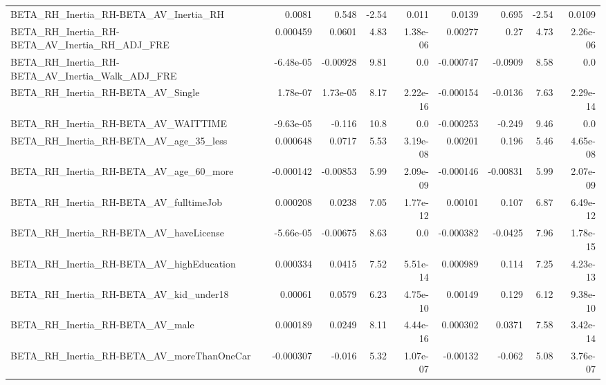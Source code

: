 \begin{tabular}{lrrrrrrrr}
BETA\_RH\_Inertia\_RH-BETA\_AV\_Inertia\_RH              &      0.0081 &        0.548 &    -2.54 &    0.011 &     0.0139 &       0.695 &        -2.54 &        0.0109 \\
BETA\_RH\_Inertia\_RH-BETA\_AV\_Inertia\_RH\_ADJ\_FRE      &    0.000459 &       0.0601 &     4.83 & 1.38e-06 &    0.00277 &        0.27 &         4.73 &      2.26e-06 \\
BETA\_RH\_Inertia\_RH-BETA\_AV\_Inertia\_Walk\_ADJ\_FRE    &   -6.48e-05 &     -0.00928 &     9.81 &      0.0 &  -0.000747 &     -0.0909 &         8.58 &           0.0 \\
BETA\_RH\_Inertia\_RH-BETA\_AV\_Single                  &    1.78e-07 &     1.73e-05 &     8.17 & 2.22e-16 &  -0.000154 &     -0.0136 &         7.63 &      2.29e-14 \\
BETA\_RH\_Inertia\_RH-BETA\_AV\_WAITTIME                &   -9.63e-05 &       -0.116 &     10.8 &      0.0 &  -0.000253 &      -0.249 &         9.46 &           0.0 \\
BETA\_RH\_Inertia\_RH-BETA\_AV\_age\_35\_less             &    0.000648 &       0.0717 &     5.53 & 3.19e-08 &    0.00201 &       0.196 &         5.46 &      4.65e-08 \\
BETA\_RH\_Inertia\_RH-BETA\_AV\_age\_60\_more             &   -0.000142 &     -0.00853 &     5.99 & 2.09e-09 &  -0.000146 &    -0.00831 &         5.99 &      2.07e-09 \\
BETA\_RH\_Inertia\_RH-BETA\_AV\_fulltimeJob             &    0.000208 &       0.0238 &     7.05 & 1.77e-12 &    0.00101 &       0.107 &         6.87 &      6.49e-12 \\
BETA\_RH\_Inertia\_RH-BETA\_AV\_haveLicense             &   -5.66e-05 &     -0.00675 &     8.63 &      0.0 &  -0.000382 &     -0.0425 &         7.96 &      1.78e-15 \\
BETA\_RH\_Inertia\_RH-BETA\_AV\_highEducation           &    0.000334 &       0.0415 &     7.52 & 5.51e-14 &   0.000989 &       0.114 &         7.25 &      4.23e-13 \\
BETA\_RH\_Inertia\_RH-BETA\_AV\_kid\_under18             &     0.00061 &       0.0579 &     6.23 & 4.75e-10 &    0.00149 &       0.129 &         6.12 &      9.38e-10 \\
BETA\_RH\_Inertia\_RH-BETA\_AV\_male                    &    0.000189 &       0.0249 &     8.11 & 4.44e-16 &   0.000302 &      0.0371 &         7.58 &      3.42e-14 \\
BETA\_RH\_Inertia\_RH-BETA\_AV\_moreThanOneCar          &   -0.000307 &       -0.016 &     5.32 & 1.07e-07 &   -0.00132 &      -0.062 &         5.08 &      3.76e-07 \\

\end{tabular}
